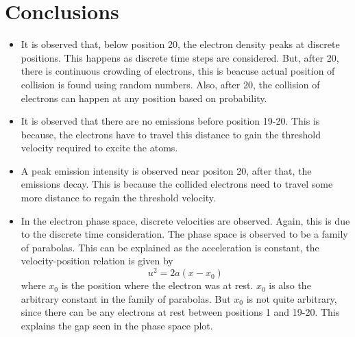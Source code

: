 \documentclass[12pt, a4paper]{article}
\begin{document}
\section{Conclusions}
\begin{itemize}
\item It is observed that, below position 20, the electron density peaks at discrete positions. This happens as discrete time steps are considered. But, after 20, there is continuous crowding of electrons, this is beacuse actual position of collision is found using random numbers. Also, after 20, the collision of electrons can happen at any position based on probability.
\item It is observed that there are no emissions before position 19-20. This is because, the electrons have to travel this distance to gain the threshold velocity required to excite the atoms.
\item A peak emission intensity is observed near positon 20, after that, the emissions decay. This is because the collided electrons need to travel some more distance to regain the threshold velocity.
\item In the electron phase space, discrete velocities are observed. Again, this is due to the discrete time consideration. The phase space is observed to be a family of parabolas. This can be explained as the acceleration is constant, the velocity-position relation is given by
\begin{equation*}
u^2 = 2a(x-x_0)
\end{equation*}
where $x_0$ is the position where the electron was at rest. $x_0$ is also the arbitrary constant in the family of parabolas. But $x_0$ is not quite arbitrary, since there can be any electrons at rest between positions 1 and 19-20. This explains the gap seen in the phase space plot.
\end{itemize}
\end{document}
